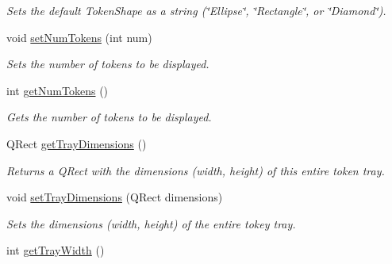 \begin{DoxyCompactItemize}
\begin{DoxyCompactList}\small\item\em Sets the default Token\-Shape as a string (\char`\"{}\-Ellipse\char`\"{}, \char`\"{}\-Rectangle\char`\"{}, or \char`\"{}\-Diamond\char`\"{}). \end{DoxyCompactList}\item 
\hypertarget{class_picto_1_1_token_tray_graphic_a5e6218a4bb3b5ad01b19baca73a1873a}{void \hyperlink{class_picto_1_1_token_tray_graphic_a5e6218a4bb3b5ad01b19baca73a1873a}{set\-Num\-Tokens} (int num)}\label{class_picto_1_1_token_tray_graphic_a5e6218a4bb3b5ad01b19baca73a1873a}

\begin{DoxyCompactList}\small\item\em Sets the number of tokens to be displayed. \end{DoxyCompactList}\item 
\hypertarget{class_picto_1_1_token_tray_graphic_ab3fe961ceaf3c4da4548bb4e0decd50a}{int \hyperlink{class_picto_1_1_token_tray_graphic_ab3fe961ceaf3c4da4548bb4e0decd50a}{get\-Num\-Tokens} ()}\label{class_picto_1_1_token_tray_graphic_ab3fe961ceaf3c4da4548bb4e0decd50a}

\begin{DoxyCompactList}\small\item\em Gets the number of tokens to be displayed. \end{DoxyCompactList}\item 
Q\-Rect \hyperlink{class_picto_1_1_token_tray_graphic_af388f5a7f12f893e09ef099cd08bf33b}{get\-Tray\-Dimensions} ()
\begin{DoxyCompactList}\small\item\em Returns a Q\-Rect with the dimensions (width, height) of this entire token tray. \end{DoxyCompactList}\item 
void \hyperlink{class_picto_1_1_token_tray_graphic_a9d964f89a1ee1ae63c0e0c5a7de331ea}{set\-Tray\-Dimensions} (Q\-Rect dimensions)
\begin{DoxyCompactList}\small\item\em Sets the dimensions (width, height) of the entire tokey tray. \end{DoxyCompactList}\item 
\hypertarget{class_picto_1_1_token_tray_graphic_a4cc5cb4eafabd64592b9e0fc385daaf5}{int \hyperlink{class_picto_1_1_token_tray_graphic_a4cc5cb4eafabd64592b9e0fc385daaf5}{get\-Tray\-Width} ()}\label{class_picto_1_1_token_tray_graphic_a4cc5cb4eafabd64592b9e0fc385daaf5}


\end{DoxyCompactItemize}
